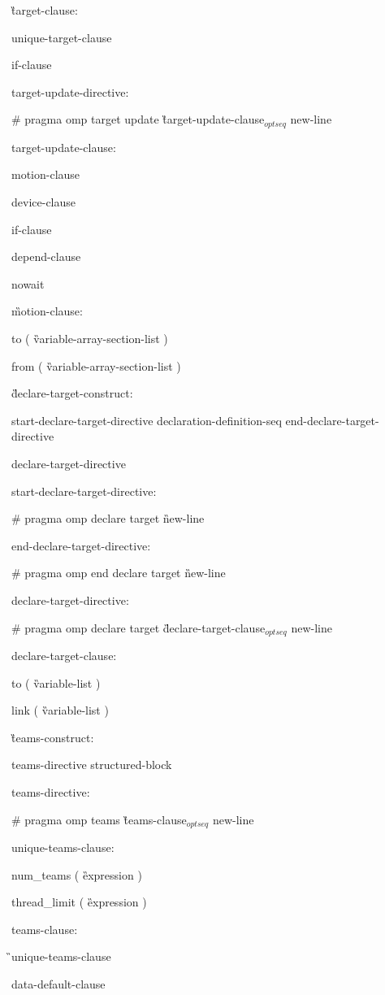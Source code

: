 {\G target-clause:

\I unique-target-clause

\I if-clause

target-update-directive:

\C\I \# pragma omp target update \G target-update-clause$_{optseq}$ new-line

target-update-clause:

\I motion-clause

\I device-clause

\I if-clause

\I depend-clause

\C\I nowait

\G motion-clause:

\C\I to ( \G variable-array-section-list \C )

\C\I from ( \G variable-array-section-list \C )

\G declare-target-construct:

\I start-declare-target-directive declaration-definition-seq end-declare-target-directive

\I declare-target-directive

start-declare-target-directive:

\C\I \# pragma omp declare target \G new-line

end-declare-target-directive:

\C\I \# pragma omp end declare target \G new-line

declare-target-directive:

\C\I \# pragma omp declare target  \G declare-target-clause$_{optseq}$ new-line

declare-target-clause:

\C\I to ( \G variable-list \C )

\C\I link ( \G variable-list \C )

\G teams-construct:

\I teams-directive structured-block

teams-directive:

\C\I \# pragma omp teams \G teams-clause$_{optseq}$ new-line

unique-teams-clause:

\C\I num\_teams ( \G expression \C )

\C\I thread\_limit ( \G expression \C )

teams-clause:

\G\I unique-teams-clause

\I data-default-clause

}
